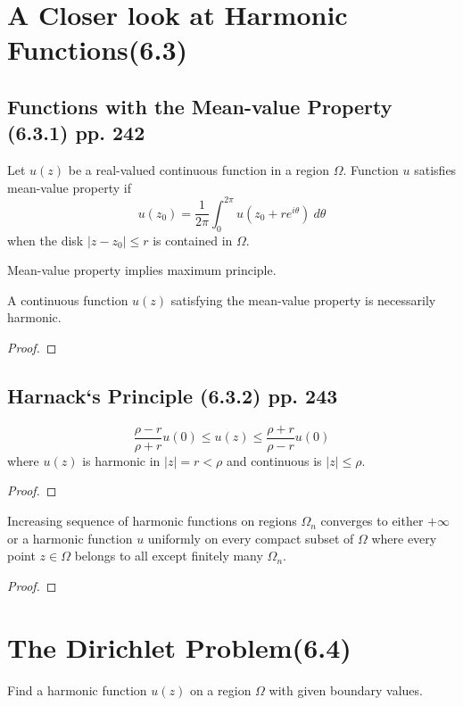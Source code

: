 \section{A Closer look at Harmonic Functions(6.3)}
\subsection{Functions with the Mean-value Property (6.3.1) pp. 242}
\begin{definition}
	Let $u(z)$ be a real-valued continuous function in a region $\Omega$. Function $u$ satisfies mean-value property if
	\[ u(z_0) = \frac{1}{2\pi} \int_0^{2\pi} u(z_0+re^{i\theta})\ d\theta \]
	when the disk $|z-z_0| \le r$ is contained in $\Omega$.
\end{definition}
\begin{remark}
	Mean-value property implies maximum principle.
\end{remark}
\begin{theorem}
	A continuous function $u(z)$ satisfying the mean-value property is necessarily harmonic.
\end{theorem}
\begin{proof}
\end{proof}

\subsection{Harnack`s Principle (6.3.2) pp. 243}
\begin{theorem}
	\[ \frac{\rho-r}{\rho+r} u(0) \le u(z) \le \frac{\rho+r}{\rho-r}u(0) \]
	where $u(z)$ is harmonic in $|z| = r < \rho$ and continuous is $|z| \le \rho$.
\end{theorem}
\begin{proof}
\end{proof}

\begin{theorem}
	Increasing sequence of harmonic functions on regions $\Omega_n$ converges to either $+\infty$ or a harmonic function $u$ uniformly on every compact subset of $\Omega$ where every point $z \in \Omega$ belongs to all except finitely many $\Omega_n$.
\end{theorem}
\begin{proof}
\end{proof}

\section{The Dirichlet Problem(6.4)}
\begin{definition}
	Find a harmonic function $u(z)$ on a region $\Omega$ with given boundary values.
\end{definition}

